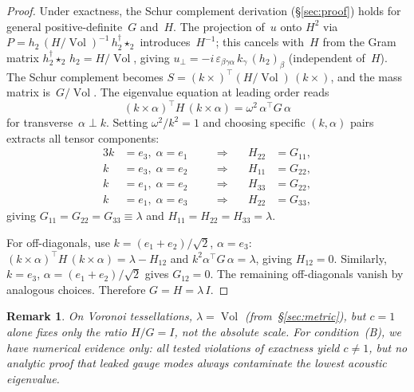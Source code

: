 \documentclass[preprint,12pt]{elsarticle}
\newtheorem{remark}{Remark}[section]
\DeclareMathOperator{\Vol}{Vol}
\begin{document}
\begin{proof}
Under exactness, the Schur complement derivation (\S\ref{sec:proof}) holds
for general positive-definite~$G$ and~$H$. The projection of~$u$ onto $H^2$
via $P = h_2\, (H/\Vol)^{-1}\, h_2^\dagger \star_2$ introduces~$H^{-1}$;
this cancels with~$H$ from the Gram matrix
$h_2^\dagger \star_2\, h_2 = H/\Vol$, giving
$u_\perp = -i\, \varepsilon_{\beta\gamma\alpha}\, k_\gamma\, (h_2)_\beta$
(independent of~$H$).
The Schur complement becomes $S = (k\times)^\top (H/\Vol)\, (k\times)$,
and the mass matrix is~$G/\Vol$.
The eigenvalue equation at leading order reads
\begin{equation}
  (k \times \alpha)^\top H\, (k \times \alpha)
  = \omega^2\, \alpha^\top G\, \alpha
  \label{eq:converse_eig}
\end{equation}
for transverse~$\alpha \perp k$. Setting $\omega^2 / k^2 = 1$ and choosing
specific $(k, \alpha)$ pairs extracts all tensor components:
\begin{alignat}{3}
  k &= e_3,\; \alpha = e_1 &\quad&\Longrightarrow\quad& H_{22} &= G_{11},
  \nonumber \\
  k &= e_3,\; \alpha = e_2 &&\Longrightarrow& H_{11} &= G_{22},
  \nonumber \\
  k &= e_1,\; \alpha = e_2 &&\Longrightarrow& H_{33} &= G_{22},
  \nonumber \\
  k &= e_1,\; \alpha = e_3 &&\Longrightarrow& H_{22} &= G_{33},
  \label{eq:diag_extraction}
\end{alignat}
giving $G_{11} = G_{22} = G_{33} \equiv \lambda$ and
$H_{11} = H_{22} = H_{33} = \lambda$.

For off-diagonals, use $k = (e_1 + e_2)/\sqrt{2}$, $\alpha = e_3$:
$(k\times\alpha)^\top H\, (k\times\alpha) = \lambda - H_{12}$
and $k^2 \alpha^\top G\, \alpha = \lambda$, giving $H_{12} = 0$.
Similarly, $k = e_3$, $\alpha = (e_1 + e_2)/\sqrt{2}$ gives $G_{12} = 0$.
The remaining off-diagonals vanish by analogous choices.
Therefore $G = H = \lambda\, I$.
\end{proof}

\begin{remark}
On Voronoi tessellations, $\lambda = \Vol$ (from~\S\ref{sec:metric}), but
$c = 1$ alone fixes only the ratio $H/G = I$, not the absolute scale.
For condition~(B), we have numerical evidence only: all tested violations
of exactness yield $c \neq 1$, but no analytic proof that leaked gauge
modes always contaminate the lowest acoustic eigenvalue.
\end{remark}
\end{document}
